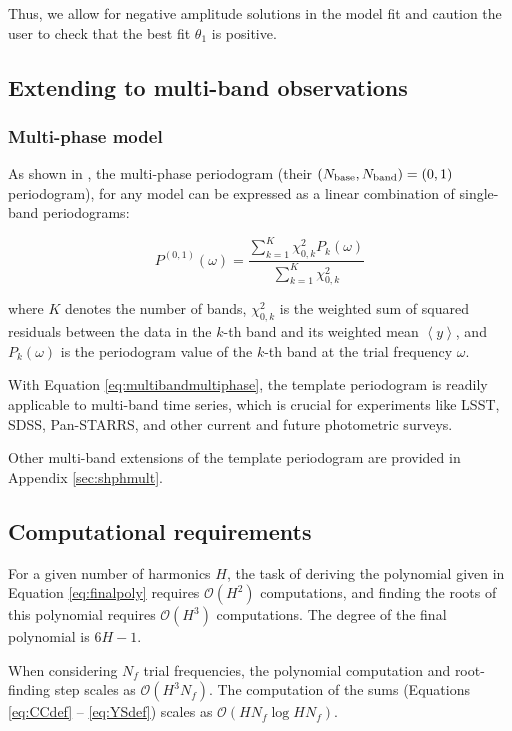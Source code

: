 \documentclass[apj]{emulateapj}
\newcommand{\bigO}{\mathcal{O}}
\newcommand{\savg}[1]{\left<#1\right>}
\begin{document}
Thus, we allow for negative amplitude solutions in the model fit and caution
the user to check that the best fit $\theta_1$ is positive.


\subsection{Extending to multi-band observations}

\subsubsection{Multi-phase model}
\label{sec:multiband}
As shown in \cite{Vanderplas+Ivezic_2015}, the multi-phase periodogram (their
$(N_{\rm base}, N_{\rm band}) = (0, 1)$ periodogram), for any model can
be expressed as a linear combination of single-band periodograms:

\begin{equation}
\label{eq:multibandmultiphase}
P^{(0,1)}(\omega) = \frac{\sum_{k=1}^K\chi^2_{0, k}P_{k}(\omega)}{\sum_{k=1}^K\chi^2_{0,k}}
\end{equation}

\noindent where $K$ denotes the number of bands, $\chi^2_{0,k}$ is the weighted sum of squared
residuals between the data in the $k$-th band and its weighted mean $\savg{y}$, and $P_k(\omega)$ is
the periodogram value of the $k$-th band at the trial frequency $\omega$.

With Equation \ref{eq:multibandmultiphase}, the template periodogram is readily applicable to multi-band
time series, which is crucial for experiments like LSST, SDSS, Pan-STARRS, and other current
and future photometric surveys.

Other multi-band extensions of the template periodogram are provided in Appendix \ref{sec:shphmult}.

\subsection{Computational requirements}\label{sec:compreqs}

For a given number of harmonics $H$, the task of deriving
the polynomial given in Equation \ref{eq:finalpoly} requires $\bigO(H^2)$ computations,
and finding the roots of this polynomial requires $\bigO(H^3)$ computations. The degree of the final
polynomial is $6H - 1$.

When considering $N_f$ trial frequencies, the polynomial computation and root-finding
step scales as $\bigO(H^3N_f)$. The computation of the sums
(Equations \ref{eq:CCdef} -- \ref{eq:YSdef}) scales as $\bigO(HN_f\log HN_f)$.
\end{document}
